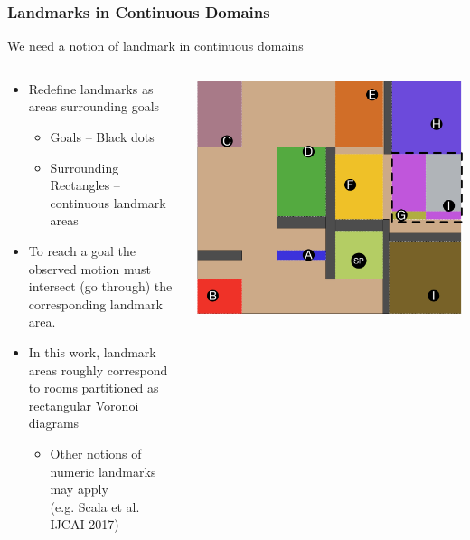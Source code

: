 \documentclass{beamer}
\begin{document}
	\begin{frame}[c]\frametitle{Landmarks in Continuous Domains}
		We need a notion of landmark in continuous domains
		\begin{columns}
			\begin{column}{0.7\textwidth}
			\begin{itemize}
				\item Redefine landmarks as areas surrounding goals
				\begin{itemize}
					\item Goals – Black dots
					\item Surrounding Rectangles – continuous landmark areas
				\end{itemize}
				\item To reach a goal the observed motion must intersect (go through) the corresponding landmark area.
				\item In this work, landmark areas roughly correspond to rooms partitioned as rectangular Voronoi diagrams
				\begin{itemize}
					\item Other notions of numeric landmarks may apply \\(e.g. Scala et al. IJCAI 2017)
				\end{itemize}
			\end{itemize}
			\end{column}
			\begin{column}{0.3\textwidth}
			\includegraphics[width=\textwidth]{fig/continuous-landmark-example.pdf}
			\end{column}
		\end{columns}
	\end{frame}
	
\end{document}
